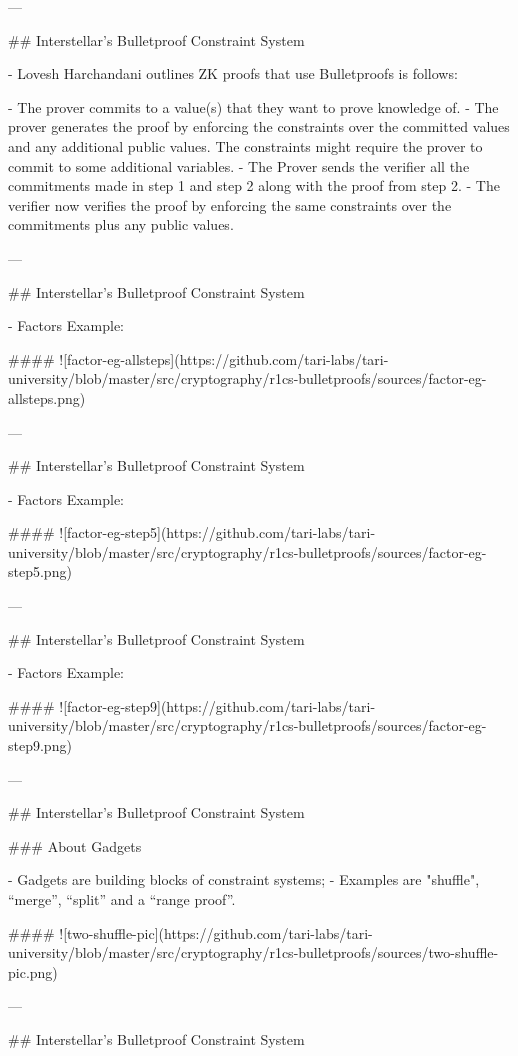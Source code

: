 --- 

## Interstellar's Bulletproof Constraint System 

- Lovesh Harchandani outlines ZK proofs that use Bulletproofs is follows: 

   - The prover commits to a value(s) that they want to prove knowledge of. 
   - The prover generates the proof by enforcing the constraints over the committed values and any additional public 
   values. The constraints might require the prover to commit to some additional variables. 
   - The Prover sends the verifier all the commitments made in step 1 and step 2 along with the proof from step 2. 
   - The verifier now verifies the proof by enforcing the same constraints over the commitments plus any public values.

--- 

## Interstellar's Bulletproof Constraint System 

- Factors Example:

#### ![factor-eg-allsteps](https://github.com/tari-labs/tari-university/blob/master/src/cryptography/r1cs-bulletproofs/sources/factor-eg-allsteps.png)

--- 

## Interstellar's Bulletproof Constraint System 

- Factors Example:

#### ![factor-eg-step5](https://github.com/tari-labs/tari-university/blob/master/src/cryptography/r1cs-bulletproofs/sources/factor-eg-step5.png)

--- 


## Interstellar's Bulletproof Constraint System 

- Factors Example:

#### ![factor-eg-step9](https://github.com/tari-labs/tari-university/blob/master/src/cryptography/r1cs-bulletproofs/sources/factor-eg-step9.png)

--- 

## Interstellar's Bulletproof Constraint System 

### About Gadgets

- Gadgets are building blocks of constraint systems; 
   - Examples are "shuffle", “merge”, “split” and a “range proof”. 

#### ![two-shuffle-pic](https://github.com/tari-labs/tari-university/blob/master/src/cryptography/r1cs-bulletproofs/sources/two-shuffle-pic.png)

--- 

## Interstellar's Bulletproof Constraint System 

